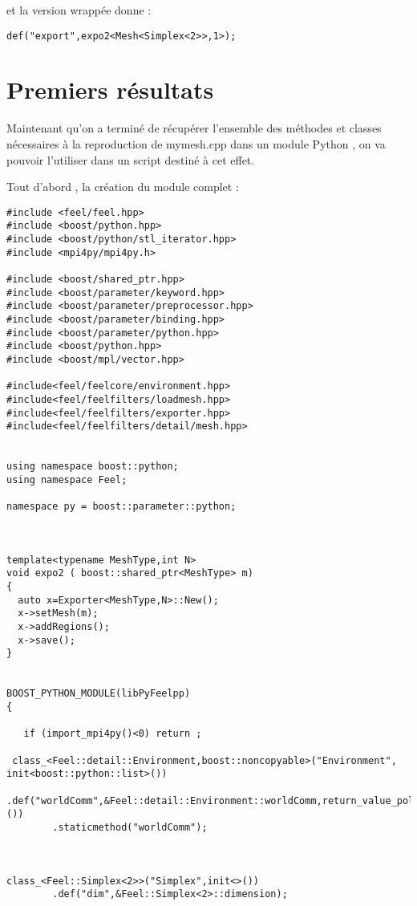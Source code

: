 \documentclass[12pt]{article}
\begin{document}
et la version wrappée donne :

\begin{lstlisting}
def("export",expo2<Mesh<Simplex<2>>,1>);
\end{lstlisting}


\section{Premiers résultats}

Maintenant qu'on a terminé de récupérer l'ensemble des méthodes et classes nécessaires à la reproduction de mymesh.cpp dans un module Python , on va pouvoir l'utiliser dans un script destiné à cet effet.

Tout d'abord , la création du module complet :

\begin{lstlisting}
#include <feel/feel.hpp>
#include <boost/python.hpp>
#include <boost/python/stl_iterator.hpp>
#include <mpi4py/mpi4py.h>

#include <boost/shared_ptr.hpp>
#include <boost/parameter/keyword.hpp>
#include <boost/parameter/preprocessor.hpp>
#include <boost/parameter/binding.hpp>
#include <boost/parameter/python.hpp>
#include <boost/python.hpp>
#include <boost/mpl/vector.hpp>

#include<feel/feelcore/environment.hpp>
#include<feel/feelfilters/loadmesh.hpp>
#include<feel/feelfilters/exporter.hpp>
#include<feel/feelfilters/detail/mesh.hpp>


using namespace boost::python;
using namespace Feel;

namespace py = boost::parameter::python;



template<typename MeshType,int N>
void expo2 ( boost::shared_ptr<MeshType> m)
{
  auto x=Exporter<MeshType,N>::New();
  x->setMesh(m);
  x->addRegions();
  x->save();
}


BOOST_PYTHON_MODULE(libPyFeelpp)
{
   
   if (import_mpi4py()<0) return ;

 class_<Feel::detail::Environment,boost::noncopyable>("Environment", init<boost::python::list>()) 
       .def("worldComm",&Feel::detail::Environment::worldComm,return_value_policy<copy_non_const_reference>())
        .staticmethod("worldComm");



class_<Feel::Simplex<2>>("Simplex",init<>())
        .def("dim",&Feel::Simplex<2>::dimension);


\end{lstlisting}
\end{document}
